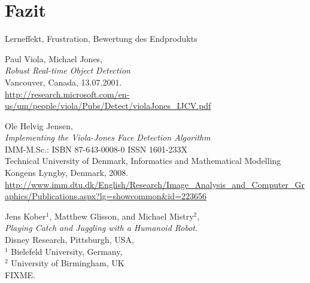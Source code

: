\documentclass[12pt,a4paper,ngerman]{scrartcl}
\begin{document}
\section{Fazit}

Lerneffekt, Frustration, Bewertung des Endprodukts


\newpage



\newpage
{}
{}
\renewcommand{\refname}{Quellen}

\begin{thebibliography}{99}

Paul Viola, Michael Jones,\\
{\em Robust Real-time Object Detection}\\
Vancouver, Canada, 13.07.2001.\\
\url{http://research.microsoft.com/en-us/um/people/viola/Pubs/Detect/violaJones_IJCV.pdf}

Ole Helvig Jensen,\\
{\em Implementing the Viola-Jones Face Detection Algorithm}\\
IMM-M.Sc.: ISBN 87-643-0008-0 \qquad ISSN 1601-233X\\
Technical University of Denmark, Informatics and Mathematical Modelling\\
Kongens Lyngby, Denmark, 2008.\\
\url{http://www.imm.dtu.dk/English/Research/Image_Analysis_and_Computer_Graphics/Publications.aspx?lg=showcommon&id=223656}

Jens Kober$^{1}$, Matthew Glisson, and Michael Mistry$^{2}$,\\
{\em Playing Catch and Juggling with a Humanoid Robot}.\\
Disney Research, Pittsburgh, USA,\\
$^{1}$ Bielefeld University, Germany,\\
$^{2}$ University of Birmingham, UK\\
FIXME.

\end{thebibliography}
\end{document}
